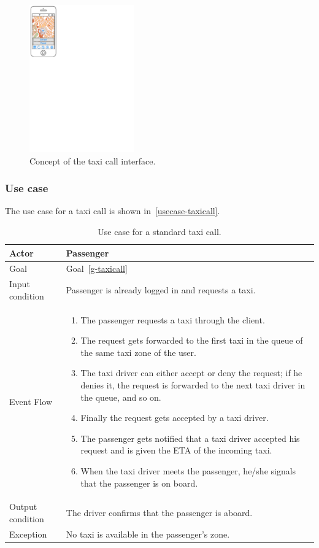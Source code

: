 \begin{figure}
\begin{center}
\includegraphics[width=0.4\textwidth]{mockup/TaxiCall.pdf}
\caption{Concept of the taxi call interface.}
\label{fig:mockup-taxicall}
\end{center}
\end{figure}

\subsubsection{Use case}
The use case for a taxi call is shown in~\autoref{usecase-taxicall}.

\begin{table}
\begin{center}
\begin{tabular}{| l | p{} |}
\hline
Actor & Passenger \\
\hline
Goal & Goal~\ref{g-taxicall}
\\
\hline
Input condition & Passenger is already logged in and requests a taxi.  \\
\hline
Event Flow & \begin{enumerate}
	\item The passenger requests a taxi through the client.
	\item The request gets forwarded to the first taxi in the queue of the same taxi zone of the user.
	\item The taxi driver can either accept or deny the request; if he denies it, the request is forwarded to the next taxi driver in the queue, and so on.
	\item Finally the request gets accepted by a taxi driver.
	\item The passenger gets notified that a taxi driver accepted his request and is given the ETA of the incoming taxi.
	\item When the taxi driver meets the passenger, he/she signals that the passenger is on board.
\end{enumerate}
\\
\hline
Output condition & The driver confirms that the passenger is aboard. \\
\hline
Exception & No taxi is available in the passenger's zone. \\
\hline
\end{tabular}
\end{center}
\caption{Use case for a standard taxi call.}
\label{usecase-taxicall}
\end{table}

